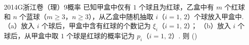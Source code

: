 
\begin{problem}{2014}{G}{浙江卷（理）}{9}{概率}
已知甲盒中仅有 $ 1 $ 个球且为红球，乙盒中有 $ m $ 个红球和 $ n $ 个蓝球（$ m\geqslant 3 $，$ n\geqslant 3 $），从乙盒中随机抽取 $ i $（$ i=1,\,2 $）个球放入甲盒中.  
（a）放入 $ i $ 个球后，甲盒中含有红球的个数记为 $ \xi_i $（$ i=1,\,2 $）；  
（b）放入 $ i $ 个球后，从甲盒中取 $ 1 $ 个球是红球的概率记为 $ p_i $（$ i=1,\,2 $）.  
则 (\hspace{1cm})
\begin{choices}
\end{choices}
\end{problem}

\begin{answer}

\end{answer}

\begin{solutions}

\end{solutions}